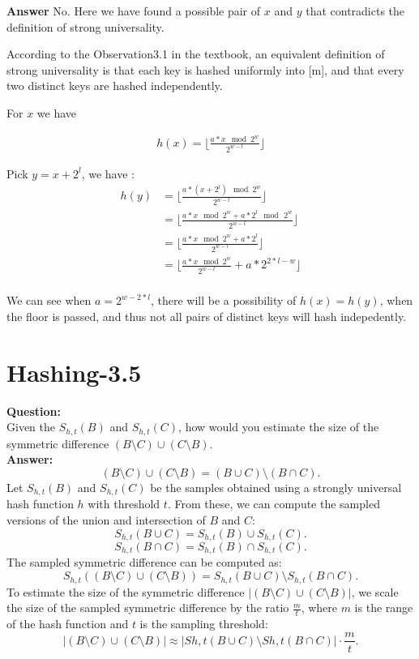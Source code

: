 \documentclass[12pt]{article}
\begin{document}
\textbf{Answer}
No. Here we have found a possible pair of $x$ and $y$ that contradicts the definition of strong universality.

According to the Observation3.1 in the textbook, an equivalent definition of strong universality is that each key is hashed uniformly into [m], and that every two distinct keys are hashed independently.

For $x$ we have 

\begin{equation}
\begin{aligned}
h(x) = \lfloor \frac{a * x \mod 2^w}{2^{w-l}} \rfloor
\end{aligned}
\end{equation}

Pick $y=x+2^{l}$, we have :
\begin{equation}
\begin{aligned}
h(y) &= \lfloor \frac{a*(x+2^l)  \mod 2^w }{2^{w-l}} \rfloor \\
&= \lfloor \frac{a*x \mod 2^w + a * 2^l \mod \, 2^w }{2^{w-l}} \rfloor \\
&= \lfloor \frac{a*x \mod 2^w + a * 2^l }{2^{w-l}} \rfloor \\
&= \lfloor \frac{a*x \mod 2^w }{2^{w-l}}  + a * 2^{2*l-w} \rfloor \\
\end{aligned}
\end{equation}

We can see when $a=2^{w-2*l}$, there will be a possibility of $h(x) = h(y)$, when the floor is passed, and thus not all pairs of distinct keys will hash indepedently.




\section{Hashing-3.5}
\textbf{Question:}\\ Given the \( S_{h,t}(B) \) and \( S_{h,t}(C) \), how would you estimate the size of the symmetric difference \( (B \setminus C) \cup (C \setminus B) \).\\
\textbf{Answer:}\\
\[
(B \setminus C) \cup (C \setminus B) = (B \cup C) \setminus (B \cap C).
\]
Let \( S_{h,t}(B) \) and \( S_{h,t}(C) \) be the samples obtained using a strongly universal hash function \( h \) with threshold \( t \). From these, we can compute the sampled versions of the union and intersection of \( B \) and \( C \):
    \[
    S_{h,t}(B \cup C) = S_{h,t}(B) \cup S_{h,t}(C).
    \]
    \[
    S_{h,t}(B \cap C) = S_{h,t}(B) \cap S_{h,t}(C).
    \]
The sampled symmetric difference can be computed as:
\[
S_{h,t}((B \setminus C) \cup (C \setminus B)) = S_{h,t}(B \cup C) \setminus S_{h,t}(B \cap C).
\]
To estimate the size of the symmetric difference \( |(B \setminus C) \cup (C \setminus B)| \), we scale the size of the sampled symmetric difference by the ratio \( \frac{m}{t} \), where \( m \) is the range of the hash function and \( t \) is the sampling threshold:
\[
|(B \setminus C) \cup (C \setminus B)| \approx \left| Sh,t(B \cup C) \setminus Sh,t(B \cap C) \right| \cdot \frac{m}{t}.
\]
\end{document}
